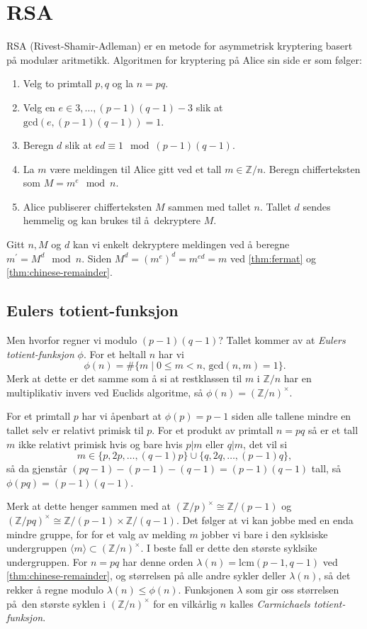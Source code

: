 
\section{RSA}

RSA (Rivest-Shamir-Adleman) \cite{rivest_method_1978} er en metode for asymmetrisk kryptering
basert på modulær aritmetikk.
Algoritmen for kryptering på Alice sin side er som følger:
\begin{enumerate}
    \item Velg to primtall $p, q$ og la $n = pq$.
    \item Velg en $e\in 3,\dots, (p - 1)(q - 1) - 3$ slik at
        $\mathrm{gcd}(e, (p - 1)(q - 1)) = 1$.
    \item Beregn $d$ slik at $e d \equiv 1\mod (p - 1)(q - 1)$.
    \item La $m$ være meldingen til Alice gitt ved et tall $m \in \mathbb Z / n$.
        Beregn chifferteksten som $M = m^e \mod n$.
    \item Alice publiserer chifferteksten $M$ sammen med tallet $n$.
        Tallet $d$ sendes hemmelig og kan brukes til å dekryptere $M$.
\end{enumerate}
Gitt $n, M$ og $d$ kan vi enkelt dekryptere meldingen ved å beregne
$m^\prime = M^d \mod n$.
Siden $M^d = {(m^e)}^d = m^{ed} = m$ ved \cref{thm:fermat}
og \cref{thm:chinese-remainder}.

\subsection{Eulers totient-funksjon}
Men hvorfor regner vi modulo $(p - 1)(q - 1)$?
Tallet kommer av at \textit{Eulers totient-funksjon} $\phi$.
For et heltall $n$ har vi
\[
    \phi(n) = \#\{m\mid 0\leq m < n,\, \mathrm{gcd}(n, m) = 1\}.
\]
Merk at dette er det samme som å si at restklassen til $m$
i $\mathbb Z / n$ har en multiplikativ invers ved Euclids algoritme,
så $\phi(n) = {(\mathbb Z / n)}^\times$.

For et primtall $p$ har vi åpenbart at $\phi(p) = p - 1$
siden alle tallene mindre en tallet selv er relativt primisk til $p$.
For et produkt av primtall $n = pq$ så er et tall $m$ ikke relativt primisk
hvis og bare hvis $p | m$ eller $q | m$,
det vil si
\[
    m\in\{p, 2p, \dots, (q - 1)p\}\cup \{q, 2q, \dots, (p - 1)q\},
\]
så da gjenstår $(pq - 1) - (p - 1) - (q - 1) = (p - 1)(q - 1)$ tall,
så $\phi(pq) = (p - 1)(q - 1)$.

Merk at dette henger sammen med at ${(\mathbb Z / p)}^\times \cong \mathbb Z / (p - 1)$
og ${(\mathbb Z / pq)}^\times\cong \mathbb Z / (p - 1)\times \mathbb Z / (q - 1)$.
Det følger at vi kan jobbe med en enda mindre gruppe,
for for et valg av melding $m$ jobber vi bare i den syklsiske undergruppen
$\langle m\rangle \subset {(\mathbb Z / n)}^\times$.
I beste fall er dette den største syklsike undergruppen.
For $n = pq$ har denne orden $\lambda(n) = \mathrm{lcm}(p - 1, q - 1)$ ved
\cref{thm:chinese-remainder}, og størrelsen på alle andre sykler deller
$\lambda(n)$, så det rekker å regne modulo $\lambda(n) \leq\phi(n)$.
Funksjonen $\lambda$ som gir oss størrelsen på den største syklen
i ${(\mathbb Z / n)}^\times$ for en vilkårlig $n$ kalles
\textit{Carmichaels totient-funksjon}.

